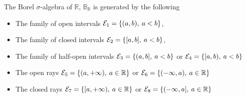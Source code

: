 \documentclass[../../main.tex]{subfiles}
\begin{document}
\newcommand{\borel}{\mathbb{B}_{\mathbb{R}}}
\newcommand{\gen}[1]{\mathcal{M}(\mathcal{E}_{#1})}
\begin{wts}
    The Borel $\sigma$-algebra of $\mathbb{R}$, $\borel$ is generated by the following
    \begin{itemize}
        \item The family of open intervals $\cal{E}_1=\{(a,b),\:a<b\}$,
        \item The family of closed intervals $\cal{E}_2=\{[a,b],\:a<b\}$,
        \item The family of half-open intervals $\cal{E}_3=\{(a,b],\:a<b\}$ or $\cal{E}_4=\{[a,b),\:a<b\}$
        \item The open rays $\cal{E}_5=\{(a,+\infty),\:a\in\mathbb{R}\}$ or $\cal{E}_6=\{(-\infty,a),\:a\in\mathbb{R}\}$
        \item The closed rays
        $\cal{E}_7=\{[a,+\infty),\:a\in\mathbb{R}\}$ or
        $\cal{E}_8=\{(-\infty,a],\:a\in\mathbb{R}\}$
    \end{itemize}
\end{wts}
\end{document}

